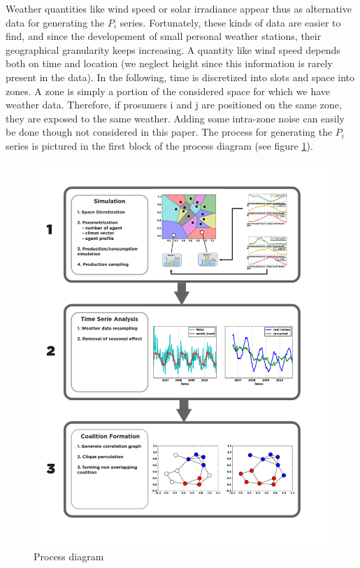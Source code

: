 \documentclass[conference]{IEEEtran}
\begin{document}
Weather quantities like wind speed or solar irradiance appear thus as alternative data for generating the $ P_{i} $ series. Fortunately, these kinds of data are easier to find, and since the developement of small personal weather stations, their geographical granularity keeps increasing.  A quantity like wind speed depends both on time and location (we neglect height since this information is rarely present in the data). In the following, time is discretized into slots and space into zones. A zone is simply a portion of the considered space for which we have weather data. Therefore, if prosumers i and j are positioned on the same zone, they are exposed to the same weather. Adding some intra-zone noise can easily be done though not considered in this paper. The process for generating the $ P_{i} $ series is pictured in the first block of the process diagram (see figure \ref{fig:process}).

\begin{figure}
\includegraphics[scale=.45]{Fig2.pdf}
\caption{Process diagram}
\label{fig:process}
\end{figure}
\end{document}
